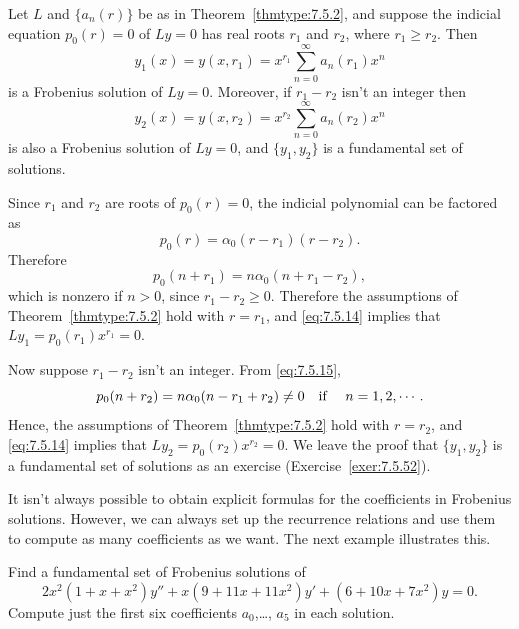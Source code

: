 \begin{theorem}
  \color{blue}
  \label{thmtype:7.5.3} Let $L$ and $\{a_{n}(r)\}$ be as in Theorem~\ref{thmtype:7.5.2}, and
  suppose the indicial equation $p_{0}(r)=0$ of $Ly=0$ has real roots $r_{1}$ and $r_{2}$, where
  $r_{1}\ge r_{2}$. Then
  \[
    y_{1}(x)=y(x,r_{1})=x^{r_{1}}\sum_{n=0}^{\infty}a_{n}(r_{1})x^{n}
  \]
  is a Frobenius solution of $Ly=0$. Moreover, if $r_{1}-r_{2}$ isn't an integer then
  \[
    y_{2}(x)=y(x,r_{2})=x^{r_{2}}\sum_{n=0}^{\infty}a_{n}(r_{2})x^{n}
  \]
  is also a Frobenius solution of $Ly=0$, and $\{y_{1},y_{2}\}$ is a fundamental set of solutions.
\end{theorem}

\proof Since $r_{1}$ and $r_{2}$ are roots of $p_{0}(r)=0$, the indicial polynomial can be factored
as
\begin{equation}
  \label{eq:7.5.15}p_{0}(r)=\alpha_{0}(r-r_{1})(r-r_{2}).
\end{equation}
Therefore
\[
  p_{0}(n+r_{1})=n\alpha_{0}(n+r_{1}-r_{2}),
\]
which is nonzero if $n>0$, since $r_{1}-r_{2}\ge0$. Therefore the assumptions of
Theorem~\ref{thmtype:7.5.2} hold with $r=r_{1}$, and \eqref{eq:7.5.14} implies that
$Ly_{1}=p_{0}(r_{1})x^{r_{1}}=0$.

Now suppose $r_{1}-r_{2}$ isn't an integer. From \eqref{eq:7.5.15},
\[
  p_{0}(n+r_{2})=n\alpha_{0}(n-r_{1}+r_{2})\ne0\mbox{\quad if \quad}n=1,2,\cdots.
\]
Hence, the assumptions of Theorem~\ref{thmtype:7.5.2} hold with $r=r_{2}$, and \eqref{eq:7.5.14}
implies that $Ly_{2}=p_{0}(r_{2})x^{r_{2}}=0$. We leave the proof that $\{y_{1},y_{2}\}$ is a
fundamental set of solutions as an exercise (Exercise~\ref{exer:7.5.52}). \bbox

It isn't always possible to obtain explicit formulas for the coefficients in Frobenius solutions.
However, we can always set up the recurrence relations and use them to compute as many coefficients
as we want. The next example illustrates this.

\begin{example}
  \label{example:7.5.1}\rm Find a fundamental set of Frobenius solutions of
  \begin{equation}
    \label{eq:7.5.16}2x^{2}(1+x+x^{2})y''+x(9+11x+11x^{2})y'+(6+10x+7x^{2})y=0.
  \end{equation}
  Compute just the first six coefficients $a_{0}$,\dots, $a_{5}$ in each solution.
\end{example}

